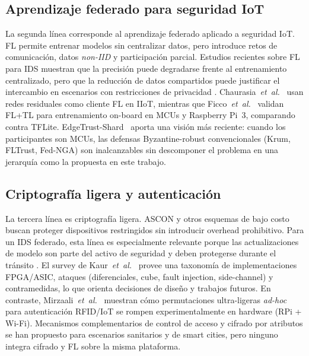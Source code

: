 \subsection{Aprendizaje federado para seguridad IoT}
La segunda línea corresponde al aprendizaje federado aplicado a seguridad IoT. FL permite entrenar modelos sin centralizar datos, pero introduce retos de comunicación, datos \textit{non-IID} y participación parcial. Estudios recientes sobre FL para IDS muestran que la precisión puede degradarse frente al entrenamiento centralizado, pero que la reducción de datos compartidos puede justificar el intercambio en escenarios con restricciones de privacidad \cite{Imteaj2022_FL_ResourceConstrainedSurvey, Albanbay2025, Hajj2023_CrossLayerFL_IDS, Roy2023_FL_AdaptedModel}. Chaurasia~\textit{et~al.}~\cite{Chaurasia2024_FL_ResNet_IIoT} usan redes residuales como cliente FL en IIoT, mientras que Ficco~\textit{et~al.}~\cite{Ficco2024_FL_TinyML_Onboard} validan FL+TL para entrenamiento on-board en MCUs y Raspberry Pi~3, comparando contra TFLite. EdgeTrust-Shard~\cite{Tran2026_EdgeTrustShard} aporta una visión más reciente: cuando los participantes son MCUs, las defensas Byzantine-robust convencionales (Krum, FLTrust, Fed-NGA) son inalcanzables sin descomponer el problema en una jerarquía como la propuesta en este trabajo.

\subsection{Criptografía ligera y autenticación}
La tercera línea es criptografía ligera. ASCON y otros esquemas de bajo costo buscan proteger dispositivos restringidos sin introducir overhead prohibitivo. Para un IDS federado, esta línea es especialmente relevante porque las actualizaciones de modelo son parte del activo de seguridad y deben protegerse durante el tránsito \cite{NISTSP8002322025, Gusita2025_LWC_Survey, Kaur2025_ASCON_Survey}. El survey de Kaur~\textit{et~al.}~\cite{Kaur2025_ASCON_Survey} provee una taxonomía de implementaciones FPGA/ASIC, ataques (diferenciales, cube, fault injection, side-channel) y contramedidas, lo que orienta decisiones de diseño y trabajos futuros. En contraste, Mirzaali~\textit{et~al.}~\cite{Mirzaali2025_LWC_Permutations} muestran cómo permutaciones ultra-ligeras \emph{ad-hoc} para autenticación RFID/IoT se rompen experimentalmente en hardware (RPi + Wi-Fi). Mecanismos complementarios de control de acceso \cite{Amoon2020_RRAC_IoT} y cifrado por atributos \cite{SaravanaBalaji2023_EdgeIoT_DL} se han propuesto para escenarios sanitarios y de smart cities, pero ninguno integra cifrado y FL sobre la misma plataforma.

